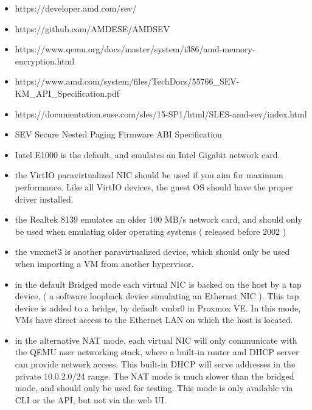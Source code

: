 \begin{itemize}[leftmargin=2cm]

	\item https://developer.amd.com/sev/

	\item https://github.com/AMDESE/AMDSEV

	\item https://www.qemu.org/docs/master/system/i386/amd-memory-encryption.html

	\item https://www.amd.com/system/files/TechDocs/55766_SEV-KM_API_Specification.pdf

	\item https://documentation.suse.com/sles/15-SP1/html/SLES-amd-sev/index.html

	\item SEV Secure Nested Paging Firmware ABI Specification

\end{itemize}

\begin{itemize}[leftmargin=2cm]

	\item Intel E1000 is the default, and emulates an Intel Gigabit network card.

	\item the VirtIO paravirtualized NIC should be used if you aim for maximum performance. Like all VirtIO devices, the guest OS should have the proper driver installed.

	\item the Realtek 8139 emulates an older 100 MB/s network card, and should only be used when emulating older operating systems ( released before 2002 )

	\item the vmxnet3 is another paravirtualized device, which should only be used when importing a VM from another hypervisor.

\end{itemize}

\begin{itemize}[leftmargin=2cm]

	\item in the default Bridged mode each virtual NIC is backed on the host by a tap device, ( a software loopback device simulating an Ethernet NIC ). This tap device is added to a bridge, by default vmbr0 in Proxmox VE. In this mode, VMs have direct access to the Ethernet LAN on which the host is located.

	\item in the alternative NAT mode, each virtual NIC will only communicate with the QEMU user networking stack, where a built-in router and DHCP server can provide network access. This built-in DHCP will serve addresses in the private 10.0.2.0/24 range. The NAT mode is much slower than the bridged mode, and should only be used for testing. This mode is only available via CLI or the API, but not via the web UI.

\end{itemize}

